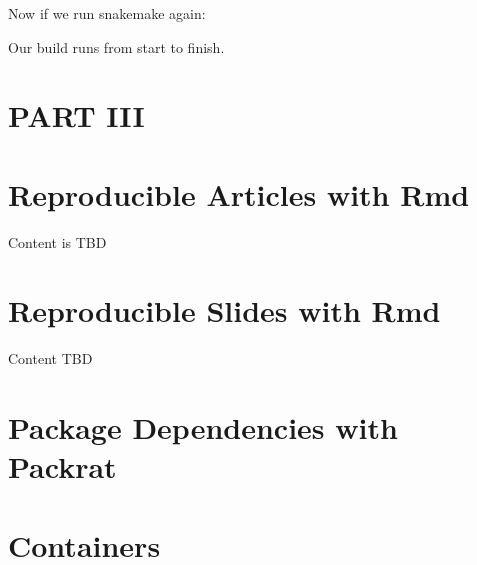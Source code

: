 \documentclass[]{book}
\newenvironment{Shaded}{\begin{snugshade}}{\end{snugshade}}
\newcommand{\KeywordTok}[1]{\textcolor[rgb]{0.13,0.29,0.53}{\textbf{{#1}}}}
\newcommand{\NormalTok}[1]{{#1}}
\theoremstyle{definition}
\theoremstyle{definition}
\theoremstyle{definition}
\theoremstyle{remark}
\begin{document}
Now if we run snakemake again:

\begin{Shaded}
\end{Shaded}

Our build runs from start to finish.

\chapter*{PART III}\label{part-iii}

\chapter{Reproducible Articles with
Rmd}\label{reproducible-articles-with-rmd}

Content is TBD

\chapter{Reproducible Slides with
Rmd}\label{reproducible-slides-with-rmd}

Content TBD

\chapter{Package Dependencies with
Packrat}\label{package-dependencies-with-packrat}

\chapter{Containers}\label{containers}


\end{document}
